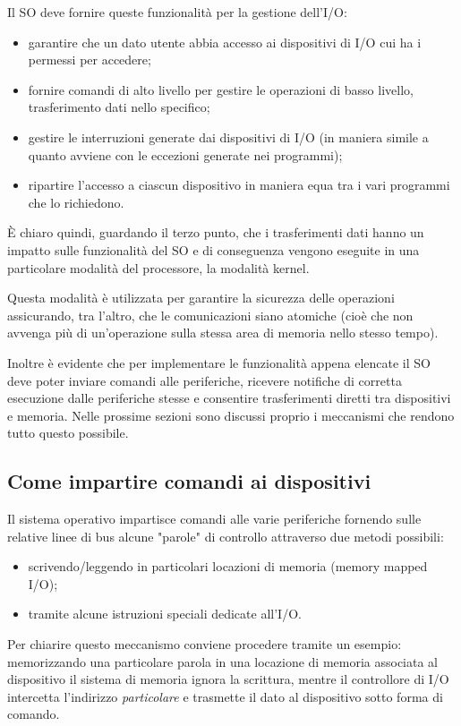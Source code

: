 \documentclass[class=book, crop=false, oneside]{standalone}
\begin{document}
Il SO deve fornire queste funzionalità per la gestione dell'I/O:
\begin{itemize}
	\item garantire che un dato utente abbia accesso ai dispositivi di I/O cui ha i permessi per accedere;
	\item fornire comandi di alto livello per gestire le operazioni di basso livello, trasferimento dati nello specifico;
	\item gestire le interruzioni generate dai dispositivi di I/O (in maniera simile a quanto avviene con le eccezioni generate nei programmi);
	\item ripartire l’accesso a ciascun dispositivo in maniera equa tra i vari programmi che lo richiedono.
\end{itemize}
È chiaro quindi, guardando il terzo punto, che i trasferimenti dati hanno un impatto sulle funzionalità del SO e di conseguenza vengono eseguite in una particolare modalità del processore, la modalità kernel.

Questa modalità è utilizzata per garantire la sicurezza delle operazioni assicurando, tra l'altro, che le comunicazioni siano atomiche (cioè che non avvenga più di un'operazione sulla stessa area di memoria nello stesso tempo).

Inoltre è evidente che per implementare le funzionalità appena elencate il SO deve poter inviare comandi alle periferiche, ricevere notifiche di corretta esecuzione dalle periferiche stesse e consentire trasferimenti diretti tra dispositivi e memoria. Nelle prossime sezioni sono discussi proprio i meccanismi che rendono tutto questo possibile.

\subsection{Come impartire comandi ai dispositivi}
Il sistema operativo impartisce comandi alle varie periferiche fornendo sulle relative linee di bus alcune "parole" di controllo attraverso due metodi possibili:
\begin{itemize}
	\item scrivendo/leggendo in particolari locazioni di memoria (memory mapped I/O);
	\item tramite alcune istruzioni speciali dedicate all’I/O.
\end{itemize}

Per chiarire questo meccanismo conviene procedere tramite un esempio:
memorizzando una particolare parola in una locazione di memoria associata al dispositivo il sistema di memoria ignora la scrittura, mentre il controllore di I/O intercetta l’indirizzo \emph{particolare} e trasmette il dato al dispositivo sotto forma di comando.
\end{document}

